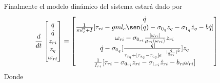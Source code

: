 \documentclass[a4paper]{IEEEtran} %
\begin{document}
Finalmente el modelo dinámico del sistema estará dado por 
\begin{equation}
    \frac{d}{dt}\begin{bmatrix}
        q \\ \dot{q}\\ {z}_{ri} \\ {z}_{q} \\\omega_{ri} 
    \end{bmatrix}=\begin{bmatrix}
        \dot{q}\\ \frac{1}{ml_c^2+I}\lbrack \tau_{ri}-gml_c\sen(q)- \sigma_{0_{q}}{z}_{q}-\sigma_{1_{q}}\dot{z}_{q} -b\dot{q}\rbrack \\ \omega_{ri}-\sigma_{0_{ri}}\frac{|\omega_{ri}|}{\mu_{ri}(\omega_{ri})}z_{ri}\\ \dot{q}-\sigma_{0_{q}}\lbrack\frac{|\dot{q}|}{\tau_{c_{q}}+\lbrack\tau_{s_{q}}-\tau_{c_{q}}\rbrack e^{-|\frac{\dot{q}}{\dot{q}_{sq}}|^2}} \rbrack {z}_{q} \\\frac{1}{I_{ri}}\lbrack \tau_{ri}-\sigma_{0_{ri}}z_{ri}-\sigma_{1_{ri}}\dot{z}_{ri}-b_{ri}\omega_{ri}\rbrack
    \end{bmatrix}
    \label{eq:sys_din_model}
\end{equation}
Donde 


\end{document}
